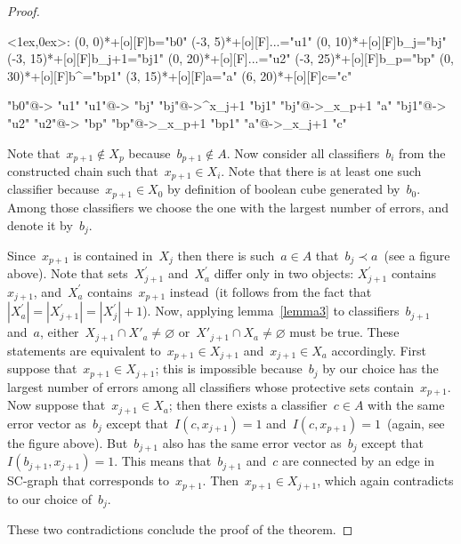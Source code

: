 \documentclass{article}
\renewcommand{\emptyset}{\varnothing}\newcommand{\emset}{\varnothing}
\newenvironment{network}%
    {\begin{xy}<1ex,0ex>:}%
    {\end{xy}}
\def\nnNode[#1](#2)#3{\POS(#2)*#3="#1"}
\def\nnLink[#1,#2]#3{\POS"#1"\ar #3 "#2"}
\begin{document}
\begin{proof}
\begin{center}
    \begin{network}
        \nnNode[b0](0, 0) {+[o][F]{b}}
        \nnNode[u1](-3, 5) {+[o][F]{...}}
        \nnNode[bj](0, 10) {+[o][F]{b_{\scriptscriptstyle j}}}
        \nnNode[bj1](-3, 15) {+[o][F]{b_{\scriptscriptstyle j+1}}}
        \nnNode[u2](0, 20) {+[o][F]{...}}
        \nnNode[bp](-3, 25) {+[o][F]{b_{\scriptscriptstyle p}}}
        \nnNode[bp1](0, 30) {+[o][F]{b^\prime}}
        \nnNode[a](3, 15) {+[o][F]{a}}
        \nnNode[c](6, 20) {+[o][F]{c}}        

        \nnLink[b0,u1] {@{->}}
        \nnLink[u1,bj] {@{->}}
        \nnLink[bj,bj1] {@{->}^{x_{j+1}}}
        \nnLink[bj,a] {@{->}_{x_{p+1}}}
        \nnLink[bj1,u2] {@{->}}
        \nnLink[u2,bp] {@{->}}
        \nnLink[bp,bp1] {@{->}_{x_{p+1}}}
        \nnLink[a,c] {@{->}_{x_{j+1}}}        
    \end{network}
\end{center}

Note that~$x_{p + 1} \notin X_{p}$ because~$b_{p + 1} \notin A$.
Now consider all classifiers~$b_i$ from the constructed chain
such that~$x_{p + 1} \in X_i$.
Note that there is at least one such classifier because~$x_{p + 1} \in X_0$
by definition of boolean cube generated by~$b_0$.
Among those classifiers we choose the one with the largest number of errors,
and denote it by~$b_j$.

Since~$x_{p + 1}$ is contained in~$X_j$ then there is such~$a \in A$
that~$b_j \prec a$~(see a figure above).
Note that sets~$X_{j + 1}^\prime$ and~$X_a^\prime$ differ only in two objects:
$X_{j + 1}^\prime$ contains~$x_{j + 1}$, and~$X_a^\prime$ contains~$x_{p + 1}$
instead~(it follows from the fact
that~$|X_a^\prime| = |X_{j + 1}^\prime| = |X_j^\prime| + 1$).
Now, applying lemma~\ref{lemma3} to classifiers~$b_{j + 1}$ and~$a$,
either~$X_{j+1} \cap X'_{a} \neq \emptyset$
or~$X'_{j+1} \cap X_{a} \neq \emptyset$
must be true.
These statements are equivalent
to~$x_{p + 1} \in X_{j + 1}$
and~$x_{j + 1} \in X_a$
accordingly.
First suppose that~$x_{p + 1} \in X_{j + 1}$;
this is impossible because~$b_j$
by our choice has the largest number of errors
among all classifiers whose protective sets contain~$x_{p + 1}$.
Now suppose that~$x_{j + 1} \in X_a$;
then there exists a classifier~$c \in A$ with the same error vector as~$b_j$
except that~$I(c, x_{j + 1}) = 1$ and~$I(c, x_{p + 1}) = 1$~(again, see the figure above).
But~$b_{j + 1}$ also has the same error vector as~$b_j$
except that~$I(b_{j + 1}, x_{j + 1}) = 1$.
This means that~$b_{j + 1}$ and~$c$ are connected by an edge in SC-graph
that corresponds to~$x_{p + 1}$.
Then~$x_{p + 1} \in X_{j + 1}$, which again contradicts to our choice of~$b_j$.

These two contradictions conclude the proof of the theorem.
\end{proof}
\end{document}
